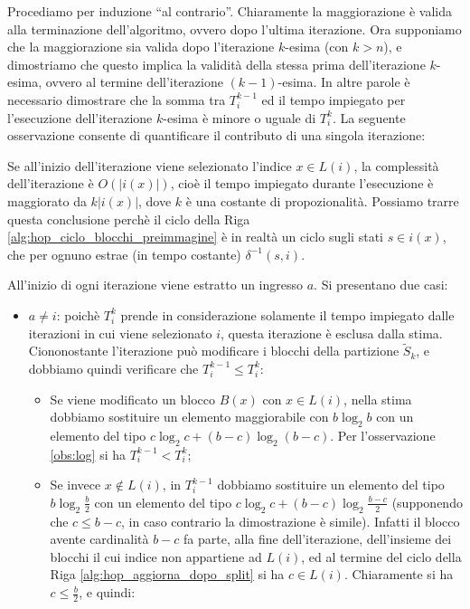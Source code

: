 \begin{proof2}
    Procediamo per induzione ``al contrario''. Chiaramente la maggiorazione è valida alla terminazione dell'algoritmo, ovvero dopo l'ultima iterazione. Ora supponiamo che la maggiorazione sia valida dopo l'iterazione $k$-esima (con $k > n$), e dimostriamo che questo implica la validità della stessa prima dell'iterazione $k$-esima, ovvero al termine dell'iterazione $(k-1)$-esima. In altre parole è necessario dimostrare che la somma tra $T_i^{k-1}$ ed il tempo impiegato per l'esecuzione dell'iterazione $k$-esima è minore o uguale di $T_i^k$. La seguente osservazione consente di quantificare il contributo di una singola iterazione:
    \begin{observation*}
        Se all'inizio dell'iterazione viene selezionato l'indice $x \in L(i)$, la complessità dell'iterazione è $O(|i(x)|)$, cioè il tempo impiegato durante l'esecuzione è maggiorato da $k|i(x)|$, dove $k$ è una costante di propozionalità. Possiamo trarre questa conclusione perchè il ciclo della Riga \ref{alg:hop_ciclo_blocchi_preimmagine} è in realtà un ciclo sugli stati $s\in i(x)$, che per ognuno estrae (in tempo costante) $\delta^{-1}(s,i)$.
    \end{observation*}
    All'inizio di ogni iterazione viene estratto un ingresso $a$. Si presentano due casi:
    \begin{itemize}
        \item $a \neq i$: poichè $T_i^k$ prende in considerazione solamente il tempo impiegato dalle iterazioni in cui viene selezionato $i$, questa iterazione è esclusa dalla stima. Ciononostante l'iterazione può modificare i blocchi della partizione $\widetilde{S}_k$, e dobbiamo quindi verificare che $T_i^{k-1} \leq T_i^k$:
        \begin{itemize}
            \item Se viene modificato un blocco $B(x)$ con $x \in L(i)$, nella stima dobbiamo sostituire un elemento maggiorabile con $b \log_2 b$ con un elemento del tipo $c \log_2 c + (b-c) \log_2 (b-c)$. Per l'osservazione \ref{obs:log} si ha $T_i^{k-1} < T_i^k$;
            \item Se invece $x \not\in L(i)$, in $T_i^{k-1}$ dobbiamo sostituire un elemento del tipo $b \log_2 \frac{b}{2}$ con un elemento del tipo $c \log_2 c + (b-c) \log_2 \frac{b-c}{2}$ (supponendo che $c \leq b - c$, in caso contrario la dimostrazione è simile). Infatti il blocco avente cardinalità $b-c$ fa parte, alla fine dell'iterazione, dell'insieme dei blocchi il cui indice non appartiene ad $L(i)$, ed al termine del ciclo della Riga \ref{alg:hop_aggiorna_dopo_split} si ha $c \in L(i)$. Chiaramente si ha $c \leq \frac{b}{2}$, e quindi:

\end{itemize}
\end{itemize}
\end{proof2}
